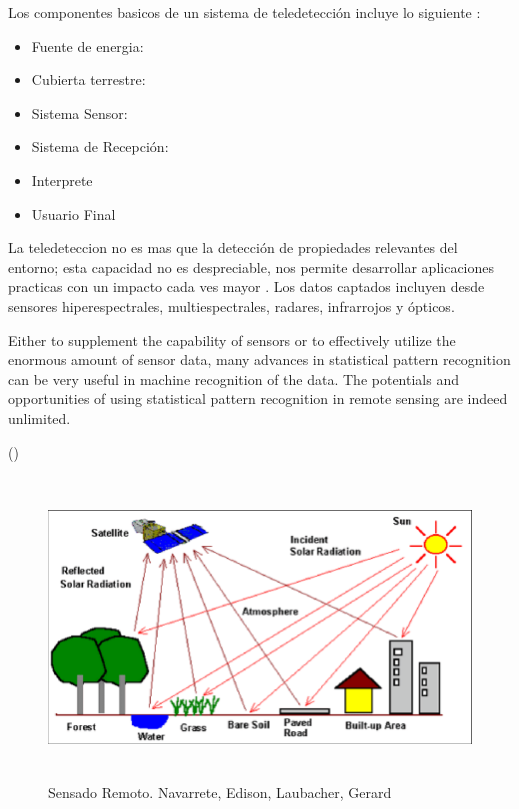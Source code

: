 Los componentes basicos de un sistema de teledetección incluye lo siguiente \citep{chuvieco}:
\begin{itemize}
\item Fuente de energia:

\item Cubierta terrestre:

\item Sistema Sensor:

\item Sistema de Recepción:

\item Interprete

\item Usuario Final
\end{itemize}





La teledeteccion no es mas que la detección de propiedades relevantes del entorno; esta capacidad no es despreciable, nos permite desarrollar aplicaciones practicas con un impacto cada ves mayor \citep{percepcion}. Los datos captados incluyen desde sensores hiperespectrales, multiespectrales, radares, infrarrojos y ópticos.

\begin{center} \begin{minipage}{0.8\linewidth}  \vspace{5pt} {\small
Either to supplement the capability of sensors or to effectively utilize the enormous amount of sensor data, many advances in statistical pattern recognition can be very useful in machine recognition of the data. The potentials and opportunities of using statistical pattern recognition in remote sensing are indeed unlimited.}
\begin{flushright} (\citeauthor{Ledda})
\end{flushright}
\end{minipage}
\end{center}

\begin{figure}[H] \centering
  \includegraphics[height=8cm,keepaspectratio=true,clip=true]{imagenes/MarcoTeorico/teledeteccion.png}
  \caption{Sensado Remoto. Navarrete, Edison, Laubacher, Gerard}\label{Fig:teledeteccion}
\end{figure}

